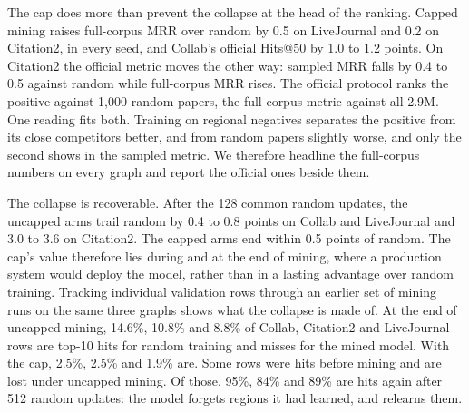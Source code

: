 The cap does more than prevent the collapse at the head of the ranking. Capped mining raises full-corpus MRR over
random by 0.5 on LiveJournal and 0.2 on Citation2, in every seed, and Collab's official Hits@50 by 1.0 to 1.2 points.
On Citation2 the official metric moves the other way: sampled MRR falls by 0.4 to 0.5 against random while full-corpus
MRR rises. The official protocol ranks the positive against 1{,}000 random papers, the full-corpus metric against all
2.9M. One reading fits both. Training on regional negatives separates the positive from its close competitors better,
and from random papers slightly worse, and only the second shows in the sampled metric. We therefore headline the
full-corpus numbers on every graph and report the official ones beside them.

 The collapse is recoverable. After the 128 common random updates, the uncapped
arms trail random by 0.4 to 0.8 points on Collab and LiveJournal and 3.0 to 3.6 on Citation2. The capped arms end
within 0.5 points of random. The cap's value therefore lies during and at the end of mining, where a production system
would deploy the model, rather than in a lasting advantage over random training. Tracking individual validation rows
through an earlier set of mining runs on the same three graphs shows what the collapse is made of. At the end of
uncapped mining, 14.6\%, 10.8\% and 8.8\% of Collab, Citation2 and LiveJournal rows are top-10 hits for random training
and misses for the mined model. With the cap, 2.5\%, 2.5\% and 1.9\% are. Some rows were hits before mining and are
lost under uncapped mining. Of those, 95\%, 84\% and 89\% are hits again after 512 random updates: the model forgets
regions it had learned, and relearns them.
